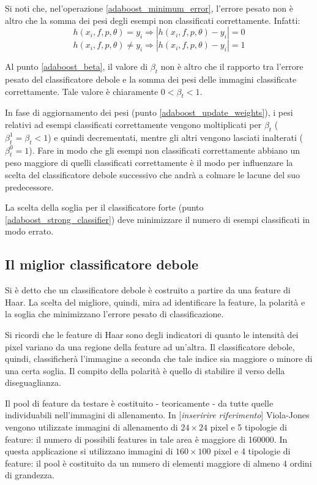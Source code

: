 \documentclass[a4paper,11pt,oneside]{article}
\begin{document}
			Si noti che, nel'operazione \ref{adaboost_minimum_error}, l'errore pesato non è altro che la somma dei pesi degli esempi non classificati correttamente. Infatti:
			$$ h(x_i, f, p, \theta) = y_i \Rightarrow |h(x_i, f, p, \theta) - y_i| = 0 $$
			$$ h(x_i, f, p, \theta) \neq y_i \Rightarrow |h(x_i, f, p, \theta) - y_i| = 1 $$

			Al punto \ref{adaboost_beta}, il valore di $\beta_t$ non è altro che il rapporto tra l'errore pesato del classificatore debole e la somma dei pesi delle immagini classificate correttamente. Tale valore è chiaramente $0 < \beta_t < 1$.

			In fase di aggiornamento dei pesi (punto \ref{adaboost_update_weights}), i pesi relativi ad esempi classificati correttamente vengono moltiplicati per $\beta_t$ ($\beta_{t}^{1} = \beta_t < 1$) e quindi decrementati, mentre gli altri vengono lasciati inalterati ($\beta_{t}^{0} = 1$). Fare in modo che gli esempi non classificati correttamente abbiano un peso maggiore di quelli classificati correttamente è il modo per influenzare la scelta del classificatore debole successivo che andrà a colmare le lacune del suo predecessore.

			La scelta della soglia per il classificatore forte (punto \ref{adaboost_strong_classifier}) deve minimizzare il numero di esempi classificati in modo errato.


		\subsection{Il miglior classificatore debole} %
		\label{sub:il_miglior_classificatore_debole}
			Si è detto che un classificatore debole è costruito a partire da una feature di Haar. La scelta del migliore, quindi, mira ad identificare la feature, la polarità e la soglia che minimizzano l'errore pesato di classificazione.

			Si ricordi che le feature di Haar sono degli indicatori di quanto le intensità dei pixel variano da una regione della feature ad un'altra. Il classificatore debole, quindi, classificherà l'immagine a seconda che tale indice sia maggiore o minore di una certa soglia. Il compito della polarità è quello di stabilire il verso della diseguaglianza.

			Il pool di feature da testare è costituito - teoricamente - da tutte quelle individuabili nell'immagini di allenamento. In [\emph{inseririre riferimento}] Viola-Jones vengono utilizzate immagini di allenamento di $24 \times 24$ pixel e 5 tipologie di feature: il numero di possibili features in tale area è maggiore di 160000. In questa applicazione si utilizzano immagini di $160 \times 100$ pixel e 4 tipologie di feature: il pool è costituito da un numero di elementi maggiore di almeno 4 ordini di grandezza.
\end{document}

